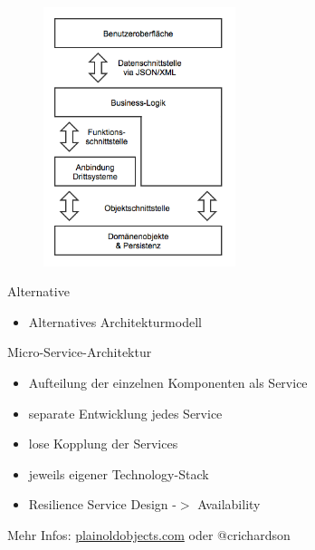\documentclass{beamer}
\begin{document}
\begin{frame}
	\begin{figure}[H]
		\centering	
		\includegraphics[width=0.5\textwidth]{img/architektur.png}
	\end{figure}
\end{frame}

\begin{frame}{Alternative}
	\begin{itemize}
		\item Alternatives Architekturmodell
	\end{itemize}
	\begin{block}{Micro-Service-Architektur}
		\begin{itemize}
			\item Aufteilung der einzelnen Komponenten als Service
			\item separate Entwicklung jedes Service
			\item lose Kopplung der Services
			\item jeweils eigener Technology-Stack
			\item Resilience Service Design -$>$ Availability
		\end{itemize}
	\end{block}
	Mehr Infos: \url{plainoldobjects.com} oder @crichardson
\end{frame}
\end{document}
